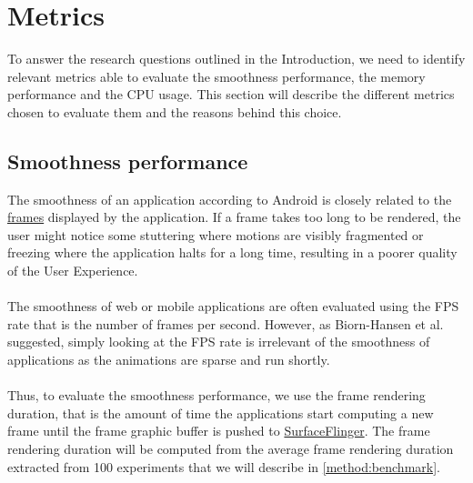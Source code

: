 \documentclass{kththesis}
\begin{document}
\section{Metrics}

To answer the research questions outlined in the Introduction, we need to identify relevant metrics able to evaluate the smoothness performance, the memory performance and the CPU usage. This section will describe the different metrics chosen to evaluate them and the reasons behind this choice. 

\subsection{Smoothness performance}

The smoothness of an application according to Android\cite{app_smoothness} is closely related to the \hyperref[def:frame]{frames} displayed by the application. If a frame takes too long to be rendered, the user might notice some stuttering where motions are visibly fragmented or freezing where the application halts for a long time, resulting in a poorer quality of the User Experience.

\paragraph{}
The smoothness of web or mobile applications are often evaluated using the FPS rate that is the number of frames per second. However, as Biorn-Hansen et al. suggested\cite{animation_performance}, simply looking at the FPS rate is irrelevant of the smoothness of applications as the animations are sparse and run shortly. 

\paragraph{}
Thus, to evaluate the smoothness performance, we use the frame rendering duration, that is the amount of time the applications start computing a new frame until the frame graphic buffer is pushed to \hyperref[def:surfaceflinger]{SurfaceFlinger}. The frame rendering duration will be computed from the average frame rendering duration extracted from 100 experiments that we will describe in \autoref{method:benchmark}. 


%
\end{document}
